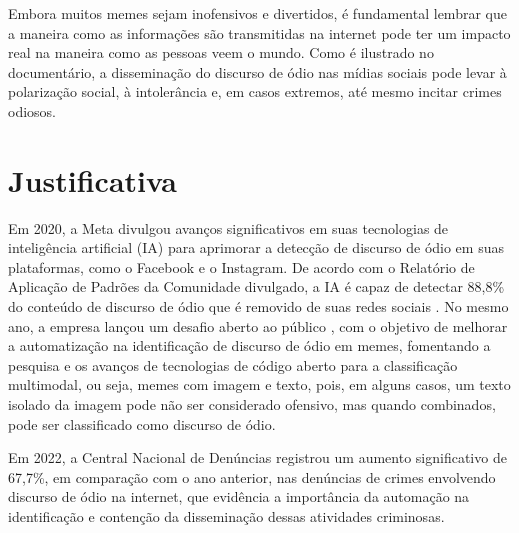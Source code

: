 
Embora muitos memes sejam inofensivos e divertidos, é fundamental lembrar que a maneira como as informações são transmitidas na internet pode ter um impacto real na maneira como as pessoas veem o mundo. Como é ilustrado no documentário, a disseminação do discurso de ódio nas mídias sociais pode levar à polarização social, à intolerância e, em casos extremos, até mesmo incitar crimes odiosos.

\section{Justificativa}


Em 2020, a Meta divulgou avanços significativos em suas tecnologias de inteligência artificial (IA) para aprimorar a detecção de discurso de ódio em suas plataformas, como o Facebook e o Instagram. De acordo com o Relatório de Aplicação de Padrões da Comunidade divulgado, a IA é capaz de detectar 88,8\% do conteúdo de discurso de ódio que é removido de suas redes sociais \cite{MetaAIAdvances2020}. No mesmo ano, a empresa lançou um desafio aberto ao público \cite{hatefulmemes2020}, com o objetivo de melhorar a automatização na identificação de discurso de ódio em memes, fomentando a pesquisa e os avanços de tecnologias de código aberto para a classificação multimodal, ou seja, memes com imagem e texto, pois, em alguns casos, um texto isolado da imagem pode não ser considerado ofensivo, mas quando combinados, pode ser classificado como discurso de ódio.

Em 2022, a Central Nacional de Denúncias \cite{Safernet2022} registrou um aumento significativo de 67,7\%, em comparação com o ano anterior, nas denúncias de crimes envolvendo discurso de ódio na internet, que evidência a importância da automação na identificação e contenção da disseminação dessas atividades criminosas.

